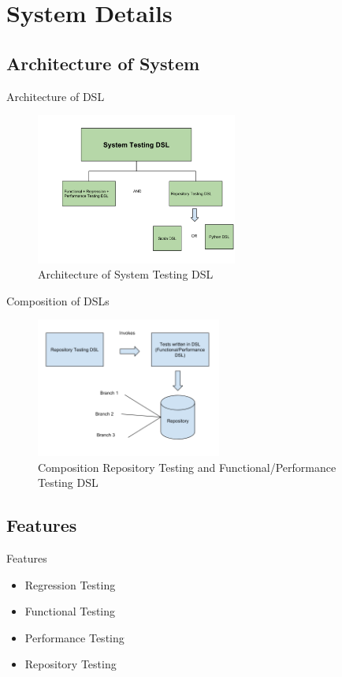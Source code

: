 \section{System Details}
\subsection{Architecture of System}
\begin{frame}{Architecture of DSL}
\begin{figure}[H]
  \centering
    \includegraphics[width=250px]{figures/architecture.png}
  \caption{Architecture of System Testing DSL}
\end{figure}
\end{frame}

\begin{frame}{Composition of DSLs}
\begin{figure}[H]
  \centering
    \includegraphics[width=230px]{figures/repo_test_diagram.png}
    \caption{Composition Repository Testing and Functional/Performance Testing DSL}
\end{figure}
\end{frame}

\subsection{Features}
\begin{frame}{Features}
\begin{itemize}
\item Regression Testing
\item Functional Testing
\item Performance Testing
\item Repository Testing
\end{itemize}
\end{frame}

